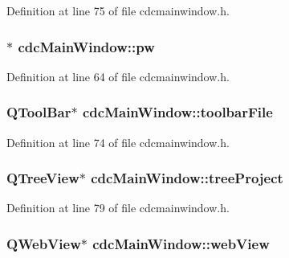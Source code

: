 Definition at line 75 of file cdcmainwindow.\+h.

\hypertarget{classcdc_main_window_a2ab9ee82b6b3a303bfecaa9f477f8595}{
\subsubsection[{pw}]{$\ast$ cdc\+Main\+Window\+::pw\hspace{0.3cm}{\ttfamily [private]}}}\label{classcdc_main_window_a2ab9ee82b6b3a303bfecaa9f477f8595}


Definition at line 64 of file cdcmainwindow.\+h.

\hypertarget{classcdc_main_window_a5d1a9fb552d49501601e0f815e1205f0}{
\subsubsection[{toolbar\+File}]{\setlength{\rightskip}{0pt plus 5cm}Q\+Tool\+Bar$\ast$ cdc\+Main\+Window\+::toolbar\+File\hspace{0.3cm}{\ttfamily [private]}}}\label{classcdc_main_window_a5d1a9fb552d49501601e0f815e1205f0}


Definition at line 74 of file cdcmainwindow.\+h.

\hypertarget{classcdc_main_window_a5adfe51057f2e53feddc1367cf50609e}{
\subsubsection[{tree\+Project}]{\setlength{\rightskip}{0pt plus 5cm}Q\+Tree\+View$\ast$ cdc\+Main\+Window\+::tree\+Project\hspace{0.3cm}{\ttfamily [private]}}}\label{classcdc_main_window_a5adfe51057f2e53feddc1367cf50609e}


Definition at line 79 of file cdcmainwindow.\+h.

\hypertarget{classcdc_main_window_a9b0360abdaa43b49ba788baf4dab83fa}{
\subsubsection[{web\+View}]{\setlength{\rightskip}{0pt plus 5cm}Q\+Web\+View$\ast$ cdc\+Main\+Window\+::web\+View\hspace{0.3cm}{\ttfamily [private]}}}\label{classcdc_main_window_a9b0360abdaa43b49ba788baf4dab83fa}


